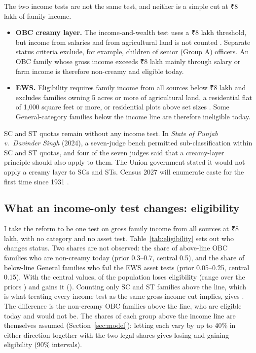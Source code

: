 \documentclass[11pt,a4paper]{article}
\newcommand{\rupee}{{\rupeefont ₹}}
\begin{document}
The two income tests are not the same test, and neither is a simple cut at \rupee8 lakh of family income.
\begin{itemize}
\item \textbf{OBC creamy layer.} The income-and-wealth test uses a \rupee8 lakh threshold, but income from salaries and from agricultural land is not counted \citep{dopt1993}. Separate status criteria exclude, for example, children of senior (Group A) officers. An OBC family whose gross income exceeds \rupee8 lakh mainly through salary or farm income is therefore non-creamy and eligible today.
\item \textbf{EWS.} Eligibility requires family income from all sources below \rupee8 lakh and excludes families owning 5 acres or more of agricultural land, a residential flat of 1,000 square feet or more, or residential plots above set sizes \citep{dopt2019}. Some General-category families below the income line are therefore ineligible today.
\end{itemize}
SC and ST quotas remain without any income test. In \emph{State of Punjab v.\ Davinder Singh} (2024), a seven-judge bench permitted sub-classification within SC and ST quotas, and four of the seven judges said that a creamy-layer principle should also apply to them. The Union government stated it would not apply a creamy layer to SCs and STs. Census 2027 will enumerate caste for the first time since 1931 \citep{pib2025}.

\subsection{What an income-only test changes: eligibility}
I take the reform to be one test on gross family income from all sources at \rupee8 lakh, with no category and no asset test. Table~\ref{tab:eligibility} sets out who changes status. Two shares are not observed: the share of above-line OBC families who are non-creamy today (prior 0.3--0.7, central 0.5), and the share of below-line General families who fail the EWS asset tests (prior 0.05--0.25, central 0.15). With the central values, \EligibilityLose{} of the population loses eligibility (range over the priors \EligibilityLoseRange) and \EligibilityGain{} gains it (\EligibilityGainRange). Counting only SC and ST families above the line, which is what treating every income test as the same gross-income cut implies, gives \EligibilityOriginal{}. The difference is the non-creamy OBC families above the line, who are eligible today and would not be. The shares of each group above the income line are themselves assumed (Section~\ref{sec:model}); letting each vary by up to 40\% in either direction together with the two legal shares gives \EligibilityLoseJoint{} losing and \EligibilityGainJoint{} gaining eligibility (90\% intervals).
\end{document}

